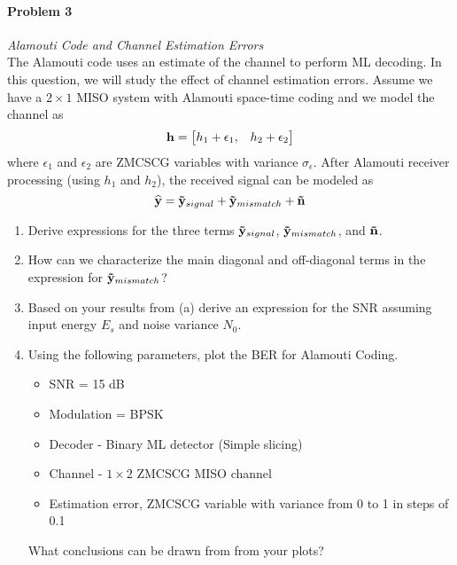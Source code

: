 \documentclass[12pt]{article}
\renewcommand{\hat}{\widehat}
\begin{document}
\paragraph{Problem 3}{\it Alamouti Code and Channel Estimation Errors}\\
The Alamouti code uses an estimate of the channel to perform ML decoding. In this question, we will study the effect of channel estimation errors. Assume we have a $2 \times 1$ MISO system with Alamouti space-time coding and we model the channel as
\begin{equation*}
{\bf h} = \begin{bmatrix} h_1 + \epsilon_1 ,& h_2 + \epsilon_2 \end{bmatrix}
\end{equation*}
where $\epsilon_1$ and $\epsilon_2$ are ZMCSCG variables with variance $\sigma_{\epsilon}$.  After Alamouti receiver processing (using $h_1$ and $h_2$), the received signal can be modeled as
\begin{equation*}
{\bf \hat{y}} = {\bf \tilde{y}}_{signal} + {\bf \tilde{y}}_{mismatch} + {\bf \tilde{n}}
\end{equation*}
\begin{enumerate}
\item Derive expressions for the three terms ${\bf \tilde{y}}_{signal}$, ${\bf \tilde{y}}_{mismatch}$, and ${\bf \tilde{n}}$. 
\item How can we characterize the main diagonal and off-diagonal terms in the expression for ${\bf \tilde y}_{mismatch}$? 
\item  Based on your results from (a) derive an expression for the SNR assuming input energy $E_s$ and noise variance $N_0$.

\item  Using the following parameters, plot the BER for Alamouti Coding.%
\begin{itemize}
\item SNR = 15 dB
\item Modulation = BPSK
\item Decoder - Binary ML detector (Simple slicing)
\item Channel - $1 \times 2$ ZMCSCG MISO channel %
\item Estimation error, ZMCSCG variable with variance from 0 to 1 in steps of 0.1
\end{itemize}
What conclusions can be drawn from from your plots?

\end{enumerate}
\end{document}
